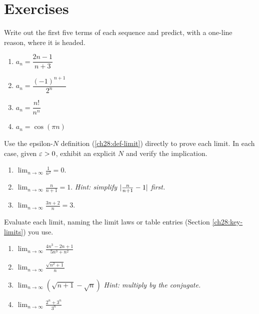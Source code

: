 \chapterline

\section*{Exercises}

\begin{exercise}
\label{ch28:exr-terms}
Write out the first five terms of each sequence and predict, with a one-line
reason, where it is headed.
\begin{enumerate}[label=(\alph*)]
  \item $a_n = \dfrac{2n - 1}{n + 3}$
  \item $a_n = \dfrac{(-1)^{n+1}}{2^n}$
  \item $a_n = \dfrac{n!}{n^n}$
  \item $a_n = \cos(\pi n)$
\end{enumerate}
\end{exercise}

\begin{exercise}
\label{ch28:exr-epsilonN}
Use the epsilon-$N$ definition (\ref{ch28:def-limit}) directly to prove each
limit. In each case, given $\varepsilon > 0$, exhibit an explicit $N$ and verify the
implication.
\begin{enumerate}[label=(\alph*)]
  \item $\displaystyle\lim_{n\to\infty} \frac{1}{n^2} = 0$.
  \item $\displaystyle\lim_{n\to\infty} \frac{n}{n+1} = 1$.
        \emph{Hint: simplify $\lvert\tfrac{n}{n+1} - 1\rvert$ first.}
  \item $\displaystyle\lim_{n\to\infty} \frac{3n + 2}{n} = 3$.
\end{enumerate}
\end{exercise}

\begin{exercise}
\label{ch28:exr-laws}
Evaluate each limit, naming the limit laws or table entries
(Section \ref{ch28:key-limits}) you use.
\begin{enumerate}[label=(\alph*)]
  \item $\displaystyle\lim_{n\to\infty} \frac{4n^3 - 2n + 1}{5n^3 + n^2}$
  \item $\displaystyle\lim_{n\to\infty} \frac{\sqrt{n^2 + 1}}{n}$
  \item $\displaystyle\lim_{n\to\infty} \left(\sqrt{n+1} - \sqrt{n}\right)$
        \emph{Hint: multiply by the conjugate.}
  \item $\displaystyle\lim_{n\to\infty} \frac{2^n + 3^n}{3^n}$
\end{enumerate}
\end{exercise}

